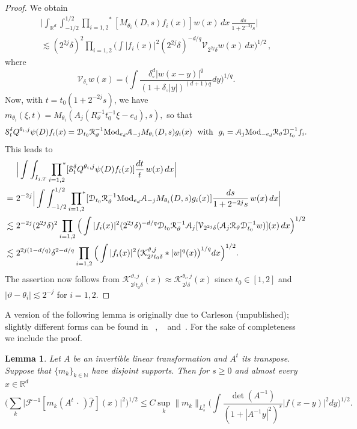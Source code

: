 \documentclass[11pt]{amsart}
\newtheorem{lemma}[theorem]{Lemma}
\theoremstyle{definition}
\numberwithin{theorem}{section}
\numberwithin{definition}{section}
\def\Mod{\text{{\rm Mod}}}
\def\prodstar{{\prod_{i=1,2}}^{\!\!*}}
\newcommand{\note}[1]{\footnote{\texttt{\Small #1}}}
\def\vth{\vartheta}
\def\lc{\lesssim}
\def\bbN{{\mathbb {N}}}
\def\bbR{{\mathbb {R}}}
\def\cA{{\mathcal {A}}}
\def\cD{{\mathcal {D}}}
\def\cF{{\mathcal {F}}}
\def\cK{{\mathcal {K}}}
\def\cR{{\mathcal {R}}}
\def\cS{{\mathcal {S}}}
\def\cV{{\mathcal {V}}}
\begin{document}
\begin{proof}
We obtain
\begin{multline*}
\Big|\int_{\bbR^d} \int_{-1/2}^{1/2}
\prodstar[M_{\theta_i}(D, s) f_i(x)]
 w(x)\, dx\,\frac{ds}{1+2^{-2j}s} \Big|
\\ \lc (2^{2j}\delta)^{2}
\prod_{i=1,2} \Big(\int|f_i(x)|^2 (2^{2j}\delta)^{-d/q}\cV_{2^{2j}\delta} w(x)\,dx\Big)^{1/2}\,,
\end{multline*}
where $$\cV_{\delta_\circ} w(x)=\Big(\int \frac{\delta_\circ^d|w(x-y)|^q}{(1+\delta_\circ|y|)^{(d+1)q}}dy
\Big)^{1/q} .$$
Now, with $t=t_0(1+2^{-2j }s)$, we have
$m_{\theta_i}(\xi, t)= M_{\theta_i}(A_j(R_\vartheta^{-1}t_0^{-1}\xi-e_d), s),$
so that
$$\cS_t^\delta  Q^{\theta_i,j}\psi(D) f_i(x)
=
\cD_{t_0} \cR_\vth^{-1} \Mod_{e_d}\cA_{-j} M_{\theta_i}(D,s)g_i(x)\ \text{ with }\
g_i=\cA_{j}\Mod_{-e_d} \cR_\vth \cD_{t_0}^{-1}f_i.
$$
This leads to
\begin{align*}
&\Big|\int\int_{I_{j,T} }
\prodstar[\cS_t^\delta  Q^{\theta_i,j}\psi(D) f_i(x)]
\frac{dt}{t}\, w(x)\,dx \Big|
\\=\ & 2^{-2j}
\Big|\int\int_{-1/2}^{1/2}\prodstar[
\cD_{t_0} \cR_\vth^{-1} \Mod_{e_d}\cA_{-j} M_{\theta_i}(D,s)g_i(x)]
\frac{ds}{1+2^{-2j} s}\, w(x)\,dx \Big|
\\
\lc\ & 2^{-2j} (2^{2j} \delta)^2
\prod_{i=1,2} \Big(\int |f_i(x)|^2 (2^{2j}\delta)^{-d/q}
\cD_{t_0}\cR_\vth^{-1} \cA_{j}
[ \cV_{2^{2j}\delta} (\cA_{j}\cR_\vth \cD_{t_0}^{-1} w)](x)\,dx\Big)^{1/2}\\
\lc\ & 2^{2j(1-d/q)} \delta^{2-d/q}
\prod_{i=1,2} \Big(\int |f_i(x)|^2
 \big(\cK^{\vth, j}_{2^jt_0\delta} *|w|^q(x)\big)^{1/q} dx\Big)^{1/2}.
\end{align*}
The assertion now follows from
$\cK^{\vth, j}_{2^jt_0\delta} (x)\approx
\cK^{\theta_i,j}_{2^j\delta} (x)$ since $t_0\in [1,2]$ and  $|\vth-\theta_i|\lc 2^{-j}$ for $i=1,2$.
\end{proof}


A version of the following lemma  is originally due to Carleson (unpublished);
slightly different forms  can be found in ~\cite{co2},
~\cite{ru0} and~\cite{se1}.
For the sake of  completeness we include the proof.

\begin{lemma}\label{carl}
Let $A$ be an invertible linear transformation and $A^t$ its transpose.
 Suppose that $\{m_k\}_{k\in\bbN}$ have disjoint supports.
Then for $s\ge 0$ and almost every $x\in \bbR^d$
$$\Big(\sum_{k}\big|\cF^{-1}[m_k(A^{t}\,\cdot\,)
  \widehat f \,](x)
\big|^2\Big)^{1/2} \le C\sup_k
  \|m_k\|_{L^2_s}
\Big(\int
\frac{\det (A^{-1})}{(1+ |A^{-1}y|^2)^s } |f(x-y)|^2 dy \Big)^{1/2}.
$$
\end{lemma}
\end{document}
